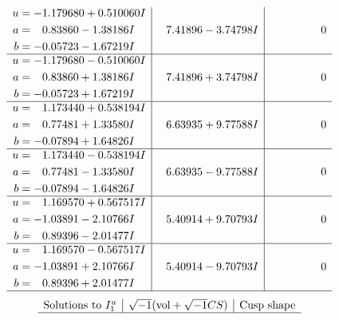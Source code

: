 \documentclass[1p]{elsarticle_modified}
\theoremstyle{definition}
\newcommand{\I}{\sqrt{-1}}
\begin{document}
$$\begin{array}{c|c|c}
\begin{aligned}
u &= -1.179680 + 0.510060 I \\
a &= \phantom{-}0.83860 - 1.38186 I \\
b &= -0.05723 - 1.67219 I\end{aligned}
 & \phantom{-}7.41896 - 3.74798 I & \phantom{-0.000000 } 0 \\ \hline\begin{aligned}
u &= -1.179680 - 0.510060 I \\
a &= \phantom{-}0.83860 + 1.38186 I \\
b &= -0.05723 + 1.67219 I\end{aligned}
 & \phantom{-}7.41896 + 3.74798 I & \phantom{-0.000000 } 0 \\ \hline\begin{aligned}
u &= \phantom{-}1.173440 + 0.538194 I \\
a &= \phantom{-}0.77481 + 1.33580 I \\
b &= -0.07894 + 1.64826 I\end{aligned}
 & \phantom{-}6.63935 + 9.77588 I & \phantom{-0.000000 } 0 \\ \hline\begin{aligned}
u &= \phantom{-}1.173440 - 0.538194 I \\
a &= \phantom{-}0.77481 - 1.33580 I \\
b &= -0.07894 - 1.64826 I\end{aligned}
 & \phantom{-}6.63935 - 9.77588 I & \phantom{-0.000000 } 0 \\ \hline\begin{aligned}
u &= \phantom{-}1.169570 + 0.567517 I \\
a &= -1.03891 - 2.10766 I \\
b &= \phantom{-}0.89396 - 2.01477 I\end{aligned}
 & \phantom{-}5.40914 + 9.70793 I & \phantom{-0.000000 } 0 \\ \hline\begin{aligned}
u &= \phantom{-}1.169570 - 0.567517 I \\
a &= -1.03891 + 2.10766 I \\
b &= \phantom{-}0.89396 + 2.01477 I\end{aligned}
 & \phantom{-}5.40914 - 9.70793 I & \phantom{-0.000000 } 0\\
 \hline 
 \end{array}$$\newpage$$\begin{array}{c|c|c}  
\text{Solutions to }I^u_{1}& \I (\text{vol} + \sqrt{-1}CS) & \text{Cusp shape}\\
 \hline 

\end{array}$$
\end{document}
